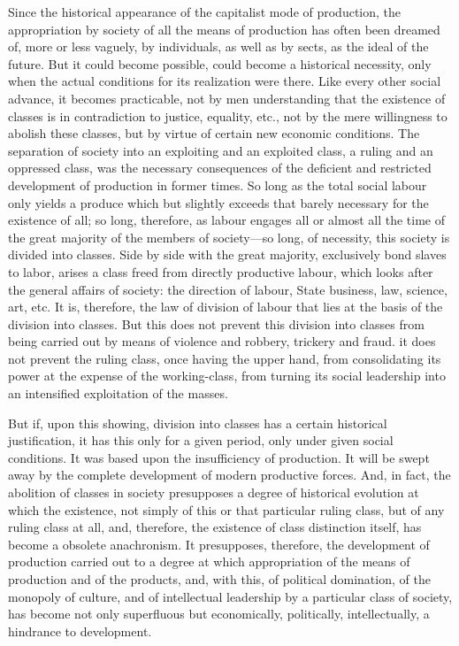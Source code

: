 Since the historical appearance of the capitalist mode of production, the
appropriation by society of all the means of production has often been dreamed
of, more or less vaguely, by individuals, as well as by sects, as the ideal of
the future. But it could become possible, could become a historical necessity,
only when the actual conditions for its realization were there. Like every other
social advance, it becomes practicable, not by men understanding that the
existence of classes is in contradiction to justice, equality, etc., not by the
mere willingness to abolish these classes, but by virtue of certain new economic
conditions. The separation of society into an exploiting and an exploited class,
a ruling and an oppressed class, was the necessary consequences of the deficient
and restricted development of production in former times. So long as the total
social labour only yields a produce which but slightly exceeds that barely
necessary for the existence of all; so long, therefore, as labour engages all or
almost all the time of the great majority of the members of society---so long,
of necessity, this society is divided into classes. Side by side with the great
majority, exclusively bond slaves to labor, arises a class freed from directly
productive labour, which looks after the general affairs of society: the
direction of labour, State business, law, science, art, etc. It is, therefore,
the law of division of labour that lies at the basis of the division into
classes. But this does not prevent this division into classes from being
carried out by means of violence and robbery, trickery and fraud. it does not
prevent the ruling class, once having the upper hand, from consolidating its
power at the expense of the working-class, from turning its social leadership
into an intensified exploitation of the masses. 

But if, upon this showing, division into classes has a certain historical
justification, it has this only for a given period, only under given social
conditions. It was based upon the insufficiency of production. It will be swept
away by the complete development of modern productive forces. And, in fact, the
abolition of classes in society presupposes a degree of historical evolution at
which the existence, not simply of this or that particular ruling class, but of
any ruling class at all, and, therefore, the existence of class distinction
itself, has become a obsolete anachronism. It presupposes, therefore, the
development of production carried out to a degree at which appropriation of the
means of production and of the products, and, with this, of political
domination, of the monopoly of culture, and of intellectual leadership by a
particular class of society, has become not only superfluous but economically,
politically, intellectually, a hindrance to development. 

